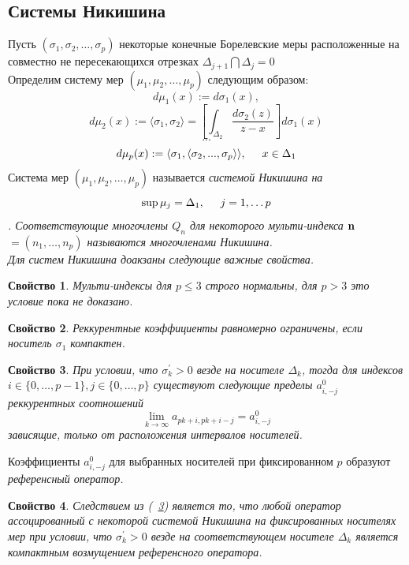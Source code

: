 \documentclass[12pt, a4paper]{report}
\newtheorem{prope}{Свойство} [chapter]
\begin{document}
\subsection {Системы Никишина}
Пусть $(\sigma_1,\sigma_2,\ldots,\sigma_p)$ некоторые конечные Борелевские меры расположенные на совместно не пересекающихся отрезках 
$\Delta_{j+1} \bigcap \Delta_j =0$ \\
Определим систему мер $(\mu_1, \mu_2,\ldots,\mu_p)$ следующим образом:
$$
 d\mu_1(x) := d\sigma_1 (x),
$$
$$
d\mu_2(x) :=  \langle \sigma_1, \sigma_2 \rangle = \left[ \int_{\Delta_2} \displaystyle\frac{d\sigma_2(z)}{z-x} \right] d\sigma_1(x)
$$
$$
 ...
$$
$$
d\mu_p(x) :=  \langle \sigma_1, \langle \sigma_2, ..., \sigma_p \rangle \rangle, \hspace{0.5cm} x \in \Delta_1 
$$
Система мер $(\mu_1,\mu_2,\ldots,\mu_p)$ называется \it системой Никишина \rm на 
$$\sup \mu_j = \Delta_1, \hspace{0.5cm} j=1,\ldots p$$.
Соответствующие многочлены $Q_n$ для некоторого мульти-индекса $\bf n \rm$ $=(n_1,\ldots,n_p)$ называются \it многочленами Никишина. \rm \\
Для систем Никишина доакзаны следующие важные свойства.
\begin{prope}
Мульти-индексы для $p \leq 3$ строго нормальны, для $p > 3$ это условие пока не доказано.
\end{prope}
\begin{prope}
Реккурентные коэффициенты равномерно ограничены, если носитель $\sigma_1$ компактен.
\end{prope}
\begin{prope}
\label{Nikishin.Limits}
При условии, что $\sigma_k^{'} >0$ везде на носителе $\Delta_k$, тогда для индексов $i \in \{0,\ldots,p-1\}, j \in \{0,\dots,p\}$ существуют следующие пределы $a_{i,-j}^{0}$  реккурентных соотношений
$$
\lim\limits_{k \rightarrow \infty} a_{pk+i, pk+i-j}=a_{i,-j}^{0}
$$
зависящие, только от расположения интервалов носителей.
\end{prope}
Коэффициенты $a_{i,-j}^{0}$ для выбранных носителей при фиксированном $p$ образуют \it референсный оператор. \rm
\begin{prope}
Следствием из (~\ref{Nikishin.Limits}) является то, что любой оператор ассоцированный с некоторой системой Никишина на фиксированных носителях мер при условии, что $\sigma_k^{'} >0$ везде на соответствующем носителе $\Delta_k$ является компактным возмущением референсного оператора. 
\end{prope}
\end{document}
